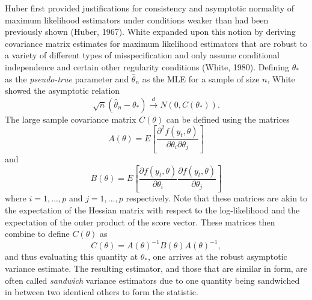 		Huber first provided justifications for consistency and asymptotic normality of maximum likelihood estimators under conditions weaker than had been previously shown (Huber, 1967). White
		expanded upon this notion by deriving covariance matrix estimates for maximum likelihood estimators that are robust to a variety of different types of misspecification and only assume
		conditional independence and certain other regularity conditions (White, 1980). Defining $\theta_*$ as the \textit{pseudo-true} parameter and $\hat{\theta}_n$ as the MLE for a sample of size
		$n$, White showed the asymptotic relation
		\begin{equation*}
			\sqrt{n} (\hat{\theta}_n - \theta_*) \xrightarrow[]{d} N(0, C(\theta_* ) ) .
		\end{equation*}
		The large sample covariance matrix $C(\theta)$ can be defined using the matrices 
		\begin{equation*}
			A(\theta) = E \left[ \frac{\partial^2 f(y_t,\theta)}{\partial \theta_i \partial \theta_j} \right] 
		\end{equation*}
		and
		\begin{equation*}
			B(\theta) = E \left[ \frac{\partial f(y_t,\theta)}{\partial \theta_i} \frac{\partial f(y_t,\theta)}{\partial \theta_j} \right] 
		\end{equation*}
		where $i = 1,...,p$ and $j = 1,...,p$ respectively. Note that these matrices are akin to the expectation of the Hessian matrix with respect to the log-likelihood and the expectation of
		the outer product of the score vector. These matrices then combine to define $C(\theta)$ as
		\begin{equation*}
			C(\theta) = A(\theta)^{-1} B(\theta) A(\theta)^{-1} ,
		\end{equation*}
		and thus evaluating this quantity at $\theta_*$, one arrives at the robust asymptotic variance estimate. The resulting estimator, and those that are similar in form, are often called \textit{sandwich}
		variance estimators due to one quantity being sandwiched in between two identical others to form the statistic.

